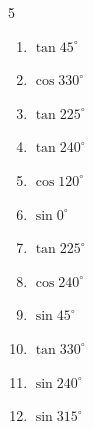 \begin{multicols}{5}
\begin{enumerate}
        \phantom{$\displaystyle =0$}

  \item $\displaystyle \tan{45^\circ}$

        \phantom{$\displaystyle =1$}

  \item $\displaystyle \cos{330^\circ}$


  \item $\displaystyle \tan{225^\circ}$

        \phantom{$\displaystyle =1$}

  \item $\displaystyle \tan{240^\circ}$


  \item $\displaystyle \cos{120^\circ}$


  \item $\displaystyle \sin{0^\circ}$

        \phantom{$\displaystyle =0$}

  \item $\displaystyle \tan{225^\circ}$

        \phantom{$\displaystyle =1$}

\columnbreak %

  \item $\displaystyle \cos{240^\circ}$


  \item $\displaystyle \sin{45^\circ}$


  \item $\displaystyle \tan{330^\circ}$


  \item $\displaystyle \sin{240^\circ}$


  \item $\displaystyle \sin{315^\circ}$



\end{enumerate}
\end{multicols}
